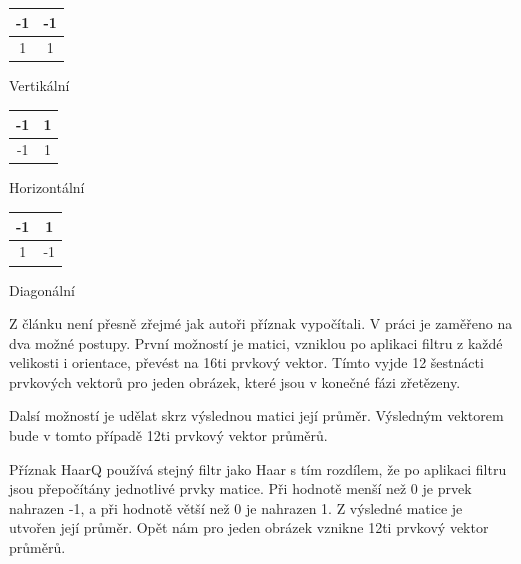 \documentclass[czech,BP]{thesiskiv}
\begin{document}
\begin{multicols}{3}
	\begin{center}
		\begin{tabular}{ | c | c | }
    		\hline
    		\cellcolor{ashgrey!50}-1 & \cellcolor{ashgrey!50}-1 \\ \hline
    		1 & 1 \\ 
    		\hline
    	\end{tabular}
    	\vspace{0.5cm}
    	\par Vertikální
	\end{center}
	\begin{center}
		\begin{tabular}{ | c | c | }
    		\hline
    		\cellcolor{ashgrey!50}-1 & 1 \\ \hline
    		\cellcolor{ashgrey!50}-1 & 1 \\ 
    		\hline
    	\end{tabular}
		\vspace{0.5cm}
    	\par Horizontální
	\end{center} 	
	\begin{center}
		\begin{tabular}{ | c | c | }
    		\hline
    		\cellcolor{ashgrey!50}-1 & 1 \\ \hline
    		1 & \cellcolor{ashgrey!50}-1 \\ 
    		\hline
    	\end{tabular}
		\vspace{0.5cm}
    	\par Diagonální
	\end{center} 	
\end{multicols}

\par Z článku \cite{JEC} není přesně zřejmé jak autoři příznak vypočítali. V práci je zaměřeno na dva možné postupy. První možností je matici, vzniklou po aplikaci filtru z každé velikosti i orientace, převést na 16ti prvkový vektor. Tímto vyjde 12 šestnácti prvkových vektorů pro jeden obrázek, které jsou v konečné fázi zřetězeny. 
\par Dalsí možností je udělat skrz výslednou matici její průměr. Výsledným vektorem bude v tomto případě 12ti prvkový vektor průměrů. 

\par Příznak HaarQ používá stejný filtr jako Haar s tím rozdílem, že po aplikaci filtru jsou přepočítány jednotlivé prvky matice. Při hodnotě menší než 0 je prvek nahrazen -1, a při hodnotě větší než 0 je nahrazen 1. Z výsledné matice je utvořen její průměr. Opět nám pro jeden obrázek vznikne 12ti prvkový vektor průměrů.   
\end{document}
